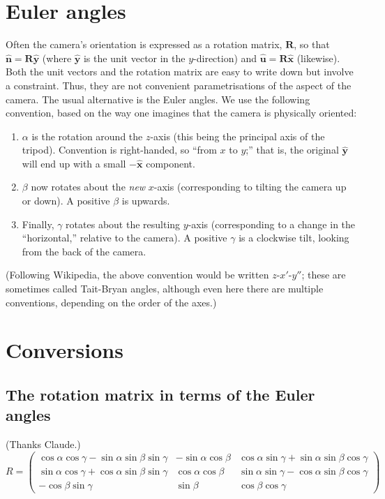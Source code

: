 \documentclass{article}
\renewcommand{\vec}[1]{\mathbf{#1}}
\begin{document}
\section*{Euler angles}
Often the camera's orientation is expressed as a rotation matrix,
$\vec{R}$, so that $\hat{\vec{n}} = \vec{R}\hat{\vec{y}}$ (where
$\hat{\vec{y}}$ is the unit vector in the $y$-direction) and
$\hat{\vec{u}}=\vec{R}\hat{\vec{x}}$ (likewise). Both the unit vectors
and the rotation matrix are easy to write down but involve a
constraint. Thus, they are not convenient parametrisations of the
aspect of the camera. The usual alternative is the Euler angles. We
use the following convention, based on the way one imagines that the
camera is physically oriented:
\begin{enumerate}
\item $\alpha$ is the rotation around the $z$-axis (this being the
  principal axis of the tripod). Convention is right-handed, so ``from
  $x$ to $y$;'' that is, the original $\hat{\vec{y}}$ will end up with
  a small $-\hat{\vec{x}}$ component.
\item $\beta$ now rotates about the \emph{new} $x$-axis (corresponding
  to tilting the camera up or down). A positive $\beta$ is upwards. 
\item Finally, $\gamma$ rotates about the resulting $y$-axis
  (corresponding to a change in the ``horizontal,'' relative to the
  camera). A positive $\gamma$ is a clockwise tilt, looking from the
  back of the camera.
\end{enumerate}
(Following Wikipedia, the above convention would be written
$z$-$x'$-$y''$; these are sometimes called Tait-Bryan angles, although
even here there are multiple conventions, depending on the order of
the axes.)

\appendix
\section*{Conversions}
\subsection*{The rotation matrix in terms of the Euler angles}

(Thanks Claude.)
\begin{equation}
  R = \left(
  \begin{matrix}
    \cos\alpha \cos\gamma - \sin\alpha \sin\beta \sin\gamma
    & -\sin\alpha \cos\beta
    & \cos\alpha \sin\gamma + \sin\alpha \sin\beta \cos\gamma \\
    \sin\alpha \cos\gamma + \cos\alpha \sin\beta \sin\gamma
    & \cos\alpha \cos\beta
    & \sin\alpha \sin\gamma - \cos\alpha \sin\beta \cos\gamma \\
    -\cos\beta \sin\gamma
    & \sin\beta
    & \cos\beta \cos\gamma
  \end{matrix}
  \right)
\end{equation}
\end{document}
